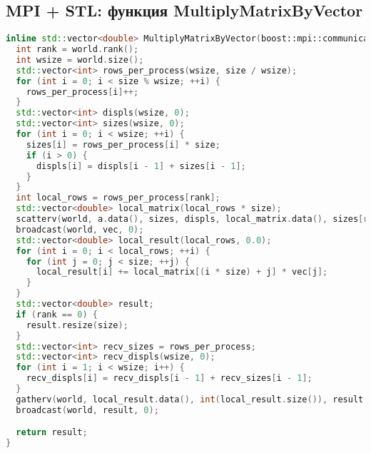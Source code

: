 \documentclass[12pt]{article}
\begin{document}
\subsection*{MPI + STL: функция MultiplyMatrixByVector}
\begin{lstlisting}[language=C++]
inline std::vector<double> MultiplyMatrixByVector(boost::mpi::communicator& world, const std::vector<double>& a, std::vector<double>& vec, int size) {
  int rank = world.rank();
  int wsize = world.size();
  std::vector<int> rows_per_process(wsize, size / wsize);
  for (int i = 0; i < size % wsize; ++i) {
    rows_per_process[i]++;
  }
  std::vector<int> displs(wsize, 0);
  std::vector<int> sizes(wsize, 0);
  for (int i = 0; i < wsize; ++i) {
    sizes[i] = rows_per_process[i] * size;
    if (i > 0) {
      displs[i] = displs[i - 1] + sizes[i - 1];
    }
  }
  int local_rows = rows_per_process[rank];
  std::vector<double> local_matrix(local_rows * size);
  scatterv(world, a.data(), sizes, displs, local_matrix.data(), sizes[rank], 0);
  broadcast(world, vec, 0);
  std::vector<double> local_result(local_rows, 0.0);
  for (int i = 0; i < local_rows; ++i) {
    for (int j = 0; j < size; ++j) {
      local_result[i] += local_matrix[(i * size) + j] * vec[j];
    }
  }
  std::vector<double> result;
  if (rank == 0) {
    result.resize(size);
  }
  std::vector<int> recv_sizes = rows_per_process;
  std::vector<int> recv_displs(wsize, 0);
  for (int i = 1; i < wsize; i++) {
    recv_displs[i] = recv_displs[i - 1] + recv_sizes[i - 1];
  }
  gatherv(world, local_result.data(), int(local_result.size()), result.data(), recv_sizes, recv_displs, 0);
  broadcast(world, result, 0);

  return result;
}
\end{lstlisting}
\end{document}
